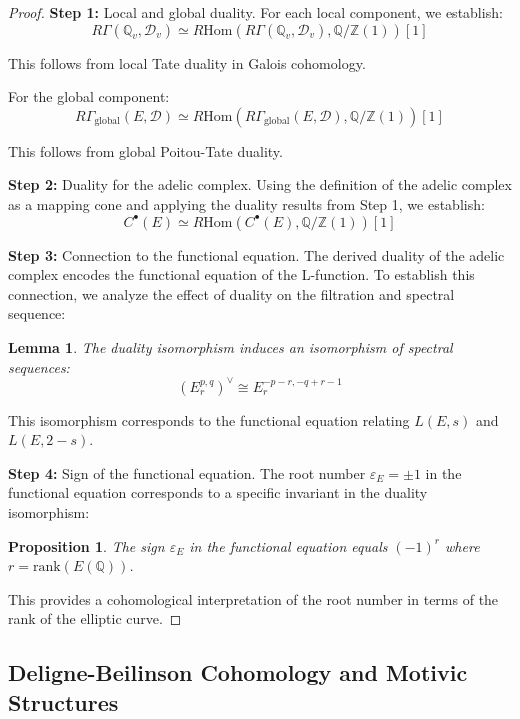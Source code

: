 \documentclass{article}
\theoremstyle{plain}
\newtheorem{proposition}[theorem]{Proposition}
\newtheorem{lemma}[theorem]{Lemma}
\theoremstyle{definition}
\theoremstyle{remark}
\begin{document}
\begin{proof}

\textbf{Step 1:} Local and global duality.
For each local component, we establish:
\[
R\Gamma(\mathbb{Q}_v, \mathcal{D}_v) \simeq R\text{Hom}(R\Gamma(\mathbb{Q}_v, \mathcal{D}_v), \mathbb{Q}/\mathbb{Z}(1))[1]
\]

This follows from local Tate duality in Galois cohomology.

For the global component:
\[
R\Gamma_{\text{global}}(E, \mathcal{D}) \simeq R\text{Hom}(R\Gamma_{\text{global}}(E, \mathcal{D}), \mathbb{Q}/\mathbb{Z}(1))[1]
\]

This follows from global Poitou-Tate duality.
\vspace{.3cm} 

\textbf{Step 2:} Duality for the adelic complex.
Using the definition of the adelic complex as a mapping cone and applying the duality results from Step 1, we establish:
\[
C^\bullet(E) \simeq R\text{Hom}(C^\bullet(E), \mathbb{Q}/\mathbb{Z}(1))[1]
\]

\textbf{Step 3:} Connection to the functional equation.
The derived duality of the adelic complex encodes the functional equation of the L-function. To establish this connection, we analyze the effect of duality on the filtration and spectral sequence:

\begin{lemma}
The duality isomorphism induces an isomorphism of spectral sequences:
\[
(E_r^{p,q})^\vee \cong E_r^{-p-r,-q+r-1}
\]
\end{lemma}

This isomorphism corresponds to the functional equation relating $L(E, s)$ and $L(E, 2 - s)$.
\vspace{.3cm} 

\textbf{Step 4:} Sign of the functional equation.
The root number $\varepsilon_E = \pm1$ in the functional equation corresponds to a specific invariant in the duality isomorphism:

\begin{proposition}
The sign $\varepsilon_E$ in the functional equation equals $(-1)^r$ where $r = \text{rank}(E(\mathbb{Q}))$.
\end{proposition}

This provides a cohomological interpretation of the root number in terms of the rank of the elliptic curve.
\end{proof}

\subsection{Deligne-Beilinson Cohomology and Motivic Structures}
\end{document}
